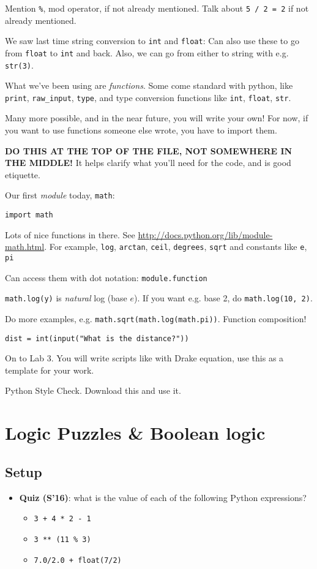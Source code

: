 \documentclass{article}
\begin{document}
Mention \verb|%|, mod operator, if not already mentioned.
Talk about \verb|5 / 2 = 2| if not already mentioned.

We saw last time string conversion to \verb|int| and \verb|float|: Can
also use these to go from \verb|float| to \verb|int| and back.  Also,
we can go from either to string with e.g. \verb|str(3)|.

What we've been using are \emph{functions}.  Some come standard with
python, like \verb|print|, \verb|raw_input|, \verb|type|, and type
conversion functions like \verb|int|, \verb|float|, \verb|str|.

Many more possible, and in the near future, you will write your own!
For now, if you want to use functions someone else wrote, you have to
import them.

\textbf{DO THIS AT THE TOP OF THE FILE, NOT SOMEWHERE IN THE MIDDLE!}
It helps clarify what you'll need for the code, and is good etiquette.

Our first \emph{module} today, \verb|math|:
\begin{verbatim}
import math
\end{verbatim}

Lots of nice functions in there.  See
\url{http://docs.python.org/lib/module-math.html}.  For example,
\verb|log|, \verb|arctan|, \verb|ceil|, \verb|degrees|, \verb|sqrt|
and constants like \verb|e|, \verb|pi|

Can access them with dot notation: \verb|module.function|

\verb|math.log(y)| is \emph{natural} log (base $e$). If you want
e.g. base 2, do \verb|math.log(10, 2)|.

Do more examples, e.g. \verb|math.sqrt(math.log(math.pi))|.  Function
composition!

\begin{verbatim}
dist = int(input("What is the distance?"))
\end{verbatim}

On to Lab 3.  You will write scripts like with Drake equation, use
this as a template for your work.

Python Style Check.  Download this and use it.

\newpage
\section{Logic Puzzles \& Boolean logic}

\subsection*{Setup}
\begin{itemize}
\item \textbf{Quiz (S'16)}: what is the value of each of the following
  Python expressions?
  \begin{itemize}
  \item \verb|3 + 4 * 2 - 1|
  \item \verb|3 ** (11 % 3)|
  \item \verb|7.0/2.0 + float(7/2)|
  \end{itemize}
\end{itemize}
\end{document}
